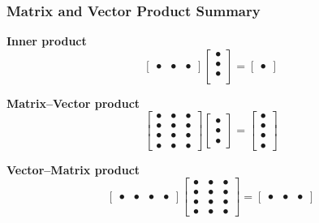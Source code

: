 \documentclass[10pt]{beamer}
\begin{document}
\begin{frame}
\frametitle{Matrix and Vector Product Summary}

\textbf{Inner product}
$$
          \begin{bmatrix} \bullet& \bullet&  \bullet \end{bmatrix}
            \begin{bmatrix} \bullet  \\
                            \bullet \\
                             \bullet  \\
             \end{bmatrix} =  \begin{bmatrix}\bullet  \end{bmatrix}
$$

\textbf{Matrix–Vector product}
\begin{equation*}
    \begin{bmatrix}\bullet & \bullet & \bullet \\
                    \bullet & \bullet & \bullet \\
                    \bullet & \bullet & \bullet \\
                    \bullet & \bullet & \bullet \end{bmatrix}
    \begin{bmatrix}\bullet \\ \bullet \\ \bullet \end{bmatrix}
    =
    \begin{bmatrix}\bullet \\ \bullet \\ \bullet \\ \bullet \end{bmatrix}
\end{equation*}

\textbf{Vector–Matrix product}
\begin{equation*}
    \begin{bmatrix}\bullet & \bullet & \bullet & \bullet \end{bmatrix}
    \begin{bmatrix}\bullet & \bullet & \bullet \\
                    \bullet & \bullet & \bullet \\
                    \bullet & \bullet & \bullet \\
                    \bullet & \bullet & \bullet \end{bmatrix}
    =
    \begin{bmatrix}\bullet & \bullet & \bullet \end{bmatrix}
\end{equation*}


\end{frame}
\end{document}
